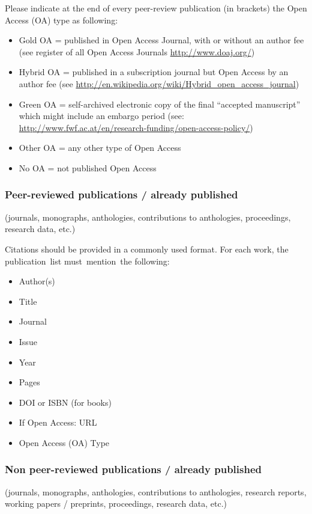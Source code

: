 \documentclass[a4paper, 11pt]{article}
\begin{document}
Please indicate at the end of every peer-review publication (in brackets) the
Open Access (OA) type as following: 

\begin{itemize}
\item Gold OA = published in Open Access Journal, with or without an author fee (see
register of all Open Access Journals \url{http://www.doaj.org/})
\item Hybrid OA = published in a subscription journal but Open Access by an author fee
(see \url{http://en.wikipedia.org/wiki/Hybrid\_open\_access\_journal}) 
\item Green OA = self-archived electronic copy of the final ``accepted manuscript''
which might include an embargo period (see:\\
\url{http://www.fwf.ac.at/en/research-funding/open-access-policy/})
\item Other OA = any other type of Open Access
\item No OA = not published Open Access 
\end{itemize}

\subsubsection{Peer-reviewed publications / already published}
(journals, monographs, anthologies, contributions to anthologies, proceedings,
research data, etc.)

Citations should be provided in a commonly used format. For each work, the
publication list must mention the following:

\begin{itemize}
\item Author(s)
\item Title
\item Journal
\item Issue
\item Year
\item Pages
\item DOI or ISBN (for books)
\item If Open Access: URL
\item Open Access (OA) Type
\end{itemize}

\subsubsection{Non peer-reviewed publications / already published}
(journals, monographs, anthologies, contributions to anthologies, research
reports, working papers / preprints, proceedings, research data, etc.)
\end{document}
